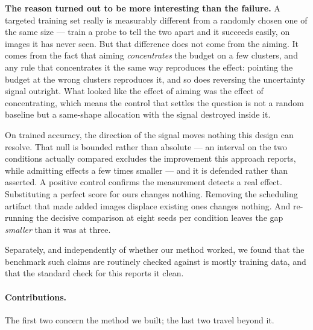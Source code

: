 \documentclass{article} %
\begin{document}
\textbf{The reason turned out to be more interesting than the failure.} A targeted training set
really is measurably different from a randomly chosen one of the same size --- train a probe to tell
the two apart and it succeeds easily, on images it has never seen. But that difference does not come
from the aiming. It comes from the fact that aiming \emph{concentrates} the budget on a few
clusters, and any rule that concentrates it the same way reproduces the effect: pointing the budget
at the wrong clusters reproduces it, and so does reversing the uncertainty signal outright. What
looked like the effect of aiming was the effect of concentrating, which means the control that
settles the question is not a random baseline but a same-shape allocation with the signal destroyed
inside it.

On trained accuracy, the direction of the signal moves nothing this design can resolve. That null is
bounded rather than absolute --- an interval on the two conditions actually compared excludes the
improvement this approach reports, while admitting effects a few times smaller --- and it is
defended rather than asserted. A positive control confirms the measurement detects a real effect.
Substituting a perfect score for ours changes nothing. Removing the scheduling artifact that made
added images displace existing ones changes nothing. And re-running the decisive comparison at eight
seeds per condition leaves the gap \emph{smaller} than it was at three.

Separately, and independently of whether our method worked, we found that the benchmark such claims
are routinely checked against is mostly training data, and that the standard check for this reports
it clean.

\paragraph{Contributions.} The first two concern the method we built; the last two travel beyond it.
\end{document}
